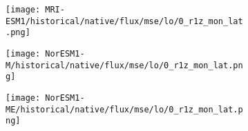 \documentclass[preview]{standalone}
\begin{document}
\begin{figure}
  \begin{subfigure}[t]{\textwidth}
    \texttt{[image: MRI-ESM1/historical/native/flux/mse/lo/0\_r1z\_mon\_lat.png]}
  \end{subfigure}
\end{figure}

\begin{figure}
  \begin{subfigure}[t]{\textwidth}
    \texttt{[image: NorESM1-M/historical/native/flux/mse/lo/0\_r1z\_mon\_lat.png]}
  \end{subfigure}
\end{figure}

\begin{figure}
  \begin{subfigure}[t]{\textwidth}
    \texttt{[image: NorESM1-ME/historical/native/flux/mse/lo/0\_r1z\_mon\_lat.png]}
  \end{subfigure}
\end{figure}
\end{document}
